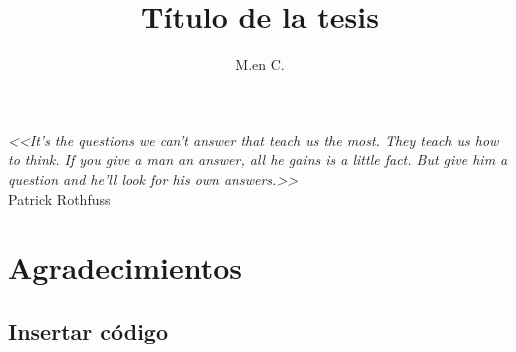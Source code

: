 \documentclass[letterpaper,12pt,oneside]{book}
\author{M.en C.}
\title{Título de la tesis}
\begin{document}
\frontmatter
\maketitle %
\chapter*{}
\begin{flushright}
	{%
	\selectfont\emph{<<It's the questions we can't answer that teach us the most. They teach us how to think. If you give a man an answer, all he gains is a little fact. But give him a question and he'll look for his own answers.>>}\\
\vspace{5mm}
	Patrick Rothfuss}

\end{flushright}
\vfill
\chapter{Agradecimientos}
\lipsum[6-9]





\mainmatter






\backmatter%


\begin{appendices}
\appendix
%
\chapter{Insertar código}


\end{appendices}


%


\end{document}
